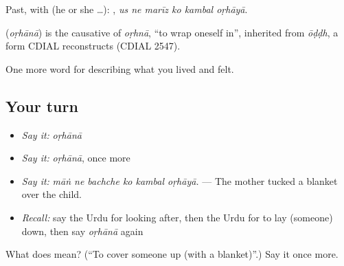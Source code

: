 Past, with  (he or she …):      , \emph{us ne marīz ko kambal oṛhāyā}.

\begin{cousinweb}
\textbf{} (\emph{oṛhānā}) is the causative of \emph{oṛhnā}, \textquotedblleft{}to wrap oneself in\textquotedblright{}, inherited from \emph{ōḍḍh}, a form CDIAL reconstructs (CDIAL 2547).
\end{cousinweb}

\begin{grammarlens}[title={What you've built}]
One more word for describing what you lived and felt.
\end{grammarlens}

\subsection*{Your turn}
\begin{itemize}
\raggedright
  \item \emph{Say it:} \emph{oṛhānā}
  \item \emph{Say it:} \emph{oṛhānā}, once more
  \item \emph{Say it:} \emph{māṅ ne bachche ko kambal oṛhāyā.} — The mother tucked a blanket over the child.
  \item \emph{Recall:} say the Urdu for looking after, then the Urdu for to lay (someone) down, then say \emph{oṛhānā} again
\end{itemize}

\begin{tcolorbox}[breakable,colback=teal!4,colframe=teal!35!black,title={Before you move on}]
What does  mean? (\textquotedblleft{}To cover someone up (with a blanket)\textquotedblright{}.) Say it once more.
\end{tcolorbox}
